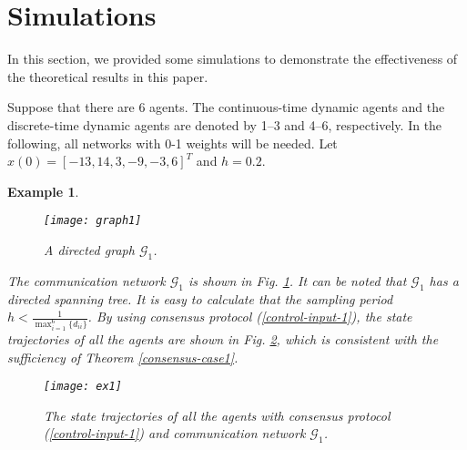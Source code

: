 \documentclass[12pt,draftcls,onecolumn]{IEEEtran}
\newtheorem{example}{Example}
\begin{document}
\section{Simulations }\label{s-Simulations}

In this section, we provided some simulations to demonstrate the effectiveness of the theoretical results in this paper.

Suppose that there are 6 agents. The continuous-time dynamic agents and the discrete-time dynamic agents are denoted by 1--3 and 4--6, respectively.
In the following, all networks with 0-1 weights will be needed. Let $x(0)=[-13,14,3,-9,-3,6]^T$ and $h=0.2$.

\begin{example}\label{ex1}
\begin{figure}[htbp]
  \centering
\texttt{[image: graph1]}\\
  \caption{A directed graph $\mathscr{G}_1$.}\label{graph-ex1}
\end{figure}


The communication network $\mathscr{G}_{1}$ is shown in Fig. \ref{graph-ex1}. It can be noted that $\mathscr{G}_{1}$ has a directed spanning tree. It is easy to calculate that the sampling period $h<\frac{1}{\max_{i=1}^6\{d_{ii}\}}$. By using consensus protocol (\ref{control-input-1}), the state trajectories of all the agents are shown in Fig. \ref{result-ex1}, which is consistent with the sufficiency of Theorem \ref{consensus-case1}.

\begin{figure}[htbp]
  \centering
\texttt{[image: ex1]}\\
  \caption{The state trajectories of all the agents with consensus protocol (\ref{control-input-1}) and communication network $\mathscr{G}_1$.}\label{result-ex1}
\end{figure}

\end{example}
\end{document}

